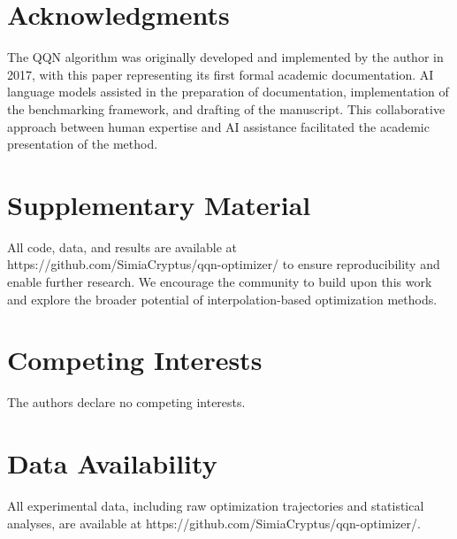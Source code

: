 \hypertarget{acknowledgments}{%
\section{Acknowledgments}\label{acknowledgments}}

The QQN algorithm was originally developed and implemented by the author in 2017, with this paper representing its first formal academic documentation.
AI language models assisted in the preparation of documentation, implementation of the benchmarking framework, and drafting of the manuscript.
This collaborative approach between human expertise and AI assistance facilitated the academic presentation of the method.

\hypertarget{supplementary-material}{%
\section{Supplementary Material}\label{supplementary-material}}

All code, data, and results are available at https://github.com/SimiaCryptus/qqn-optimizer/ to ensure reproducibility and enable further research.
We encourage the community to build upon this work and explore the broader potential of interpolation-based optimization methods.

\hypertarget{competing-interests}{%
\section{Competing Interests}\label{competing-interests}}

The authors declare no competing interests.

\hypertarget{data-availability}{%
\section{Data Availability}\label{data-availability}}

All experimental data, including raw optimization trajectories and statistical analyses, are available at https://github.com/SimiaCryptus/qqn-optimizer/.
